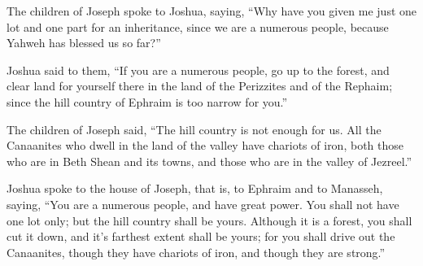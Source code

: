{The children of Joseph spoke to Joshua, saying, “Why have you given me just one lot and one part for an inheritance, since we are a numerous people, because Yahweh has blessed us so far?”
\par }{\PP {}Joshua said to them, “If you are a numerous people, go up to the forest, and clear land for yourself there in the land of the Perizzites and of the Rephaim; since the hill country of Ephraim is too narrow for you.”
\par }{\PP {}The children of Joseph said, “The hill country is not enough for us. All the Canaanites who dwell in the land of the valley have chariots of iron, both those who are in Beth Shean and its towns, and those who are in the valley of Jezreel.”
\par }{\PP {}Joshua spoke to the house of Joseph, that is, to Ephraim and to Manasseh, saying, “You are a numerous people, and have great power. You shall not have one lot only;
but the hill country shall be yours. Although it is a forest, you shall cut it down, and it’s farthest extent shall be yours; for you shall drive out the Canaanites, though they have chariots of iron, and though they are strong.”

}
